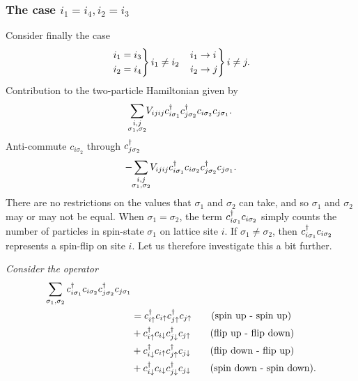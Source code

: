 \subsubsection*{The case $i_1=i_4, i_2=i_3$}
Consider finally the case
\begin{align*}
	\begin{rcases}
		i_1 = i_3 \\
		i_2 = i_4
	\end{rcases} i_1 \ne i_2 &&
	\begin{rcases}
		i_1 \rightarrow i \\
		i_2 \rightarrow j
	\end{rcases} i \ne j.
\end{align*}
Contribution to the two-particle Hamiltonian given by
\begin{equation}
	\sum_{\mathclap{\substack{i,j \\ \sigma_1, \sigma_2}}}V_{ijij}\cd_{i\sigma_1}\cd_{j\sigma_2}c_{i\sigma_2}c_{j\sigma_1}.
\end{equation}
Anti-commute $c_{i\sigma_2}$ through $c^{\dagger}_{j\sigma_2}$
\begin{equation}
	-\sum_{\mathclap{\substack{i,j \\ \sigma_1, \sigma_2}}}V_{ijij}\cd_{i\sigma_1}c_{i\sigma_2}\cd_{j\sigma_2}c_{j\sigma_1}.
\end{equation}
There are no restrictions on the values that $\sigma_1$ and $\sigma_2$ can take, and so $\sigma_1$ and $\sigma_2$ may or may not be equal.
When $\sigma_1 = \sigma_2$, the term $c^{\dagger}_{i\sigma_1}c_{i\sigma_2}$ simply counts the number of particles in spin-state $\sigma_1$ on lattice site $i$. 
If $\sigma_1\ne\sigma_2$, then $c^{\dagger}_{i\sigma_1}c_{i\sigma_2}$ represents a spin-flip on site $i$.
Let us therefore investigate this a bit further. 

\emph{Consider the operator}
\begin{align*}
	\sum_{\sigma_1, \sigma_2}c^{\dagger}_{i\sigma_1}c_{i\sigma_2}c^{\dagger}_{j\sigma_2}c_{j\sigma_1}& \\
	&= c^{\dagger}_{i\uparrow}c_{i\uparrow}c^{\dagger}_{j\uparrow}c_{j\uparrow} \qquad \text{(spin up - spin up)} \\
	&+ c^{\dagger}_{i\uparrow}c_{i\downarrow}c^{\dagger}_{j\downarrow}c_{j\uparrow} \qquad \text{(flip up - flip down)} \\
	&+c^{\dagger}_{i\downarrow}c_{i\uparrow}c^{\dagger}_{j\uparrow}c_{j\downarrow} \qquad \text{(flip down - flip up)}\\
	&+ c^{\dagger}_{i\downarrow}c_{i\downarrow}c^{\dagger}_{j\downarrow}c_{j\downarrow} \qquad \text{(spin down - spin down)}.
\end{align*}

